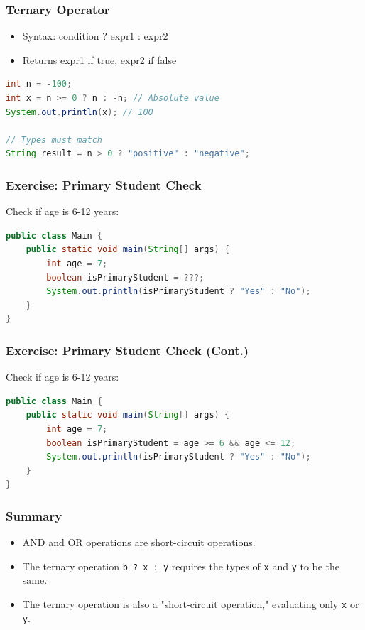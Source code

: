\documentclass[serif, aspectratio=169]{beamer}
\begin{document}
\begin{frame}[fragile]
\frametitle{Ternary Operator}
\begin{itemize}
    \item Syntax: condition ? expr1 : expr2
    \item Returns expr1 if true, expr2 if false
\end{itemize}
\begin{lstlisting}[language=Java]
int n = -100;
int x = n >= 0 ? n : -n; // Absolute value
System.out.println(x); // 100

// Types must match
String result = n > 0 ? "positive" : "negative";
\end{lstlisting}
\end{frame}

\begin{frame}[fragile]
\frametitle{Exercise: Primary Student Check}
Check if age is 6-12 years:
\begin{lstlisting}[language=Java]
public class Main {
    public static void main(String[] args) {
        int age = 7;
        boolean isPrimaryStudent = ???;
        System.out.println(isPrimaryStudent ? "Yes" : "No");
    }
}
\end{lstlisting}
\end{frame}
\begin{frame}[fragile]
\frametitle{Exercise: Primary Student Check (Cont.)}
Check if age is 6-12 years:
\begin{lstlisting}[language=Java]
public class Main {
    public static void main(String[] args) {
        int age = 7;
        boolean isPrimaryStudent = age >= 6 && age <= 12;
        System.out.println(isPrimaryStudent ? "Yes" : "No");
    }
}
\end{lstlisting}
\end{frame}

\begin{frame}[fragile]
\frametitle{Summary}
\begin{itemize}
    \item AND and OR operations are short-circuit operations.
    \item The ternary operation \texttt{b ? x : y} requires the types of \texttt{x} and \texttt{y} to be the same.
    \item The ternary operation is also a "short-circuit operation," evaluating only \texttt{x} or \texttt{y}.
\end{itemize}
\end{frame}
\end{document}
